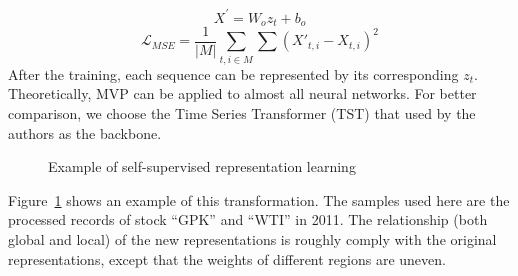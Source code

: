 \begin{equation} 
    X^\prime = W_o z_t + b_o 
\end{equation}
\begin{equation} 
    \mathcal{L}_{MSE} = \frac{1}{|M|} \sum_{t,i \in M} \sum (X\prime_{t,i} - X_{t,i}) ^ 2
\end{equation}
After the training, each sequence can be represented by its corresponding $z_t$. Theoretically, MVP can be applied to almost all neural networks. For better comparison, we choose the Time Series Transformer (TST) that used by the authors as the backbone. 
\begin{figure}[!htbp]
    \centering 
    \caption{Example of self-supervised representation learning} 
    \label{fig:gpkwti1} 
\end{figure} 
Figure~\ref{fig:gpkwti1} shows an example of this transformation. The samples used here are the processed records of stock ``GPK'' and ``WTI'' in 2011. The relationship (both global and local) of the new representations is roughly comply with the original representations, except that the weights of different regions are uneven. 

